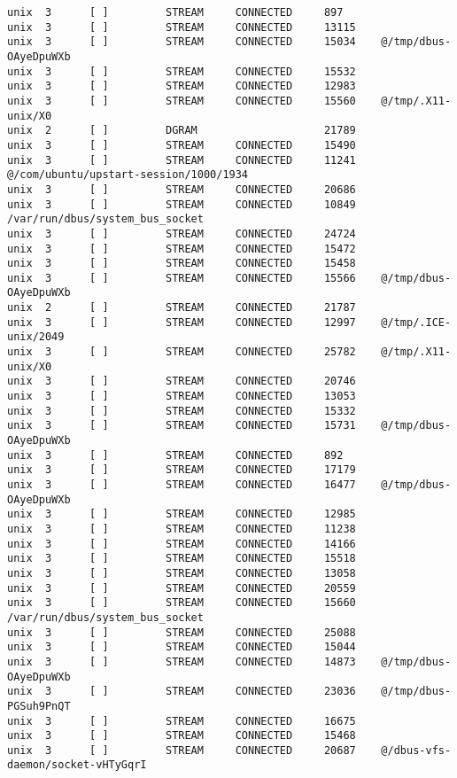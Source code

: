 \begin{lstlisting}
unix  3      [ ]         STREAM     CONNECTED     897      
unix  3      [ ]         STREAM     CONNECTED     13115    
unix  3      [ ]         STREAM     CONNECTED     15034    @/tmp/dbus-OAyeDpuWXb
unix  3      [ ]         STREAM     CONNECTED     15532    
unix  3      [ ]         STREAM     CONNECTED     12983    
unix  3      [ ]         STREAM     CONNECTED     15560    @/tmp/.X11-unix/X0
unix  2      [ ]         DGRAM                    21789    
unix  3      [ ]         STREAM     CONNECTED     15490    
unix  3      [ ]         STREAM     CONNECTED     11241    @/com/ubuntu/upstart-session/1000/1934
unix  3      [ ]         STREAM     CONNECTED     20686    
unix  3      [ ]         STREAM     CONNECTED     10849    /var/run/dbus/system_bus_socket
unix  3      [ ]         STREAM     CONNECTED     24724    
unix  3      [ ]         STREAM     CONNECTED     15472    
unix  3      [ ]         STREAM     CONNECTED     15458    
unix  3      [ ]         STREAM     CONNECTED     15566    @/tmp/dbus-OAyeDpuWXb
unix  2      [ ]         STREAM     CONNECTED     21787    
unix  3      [ ]         STREAM     CONNECTED     12997    @/tmp/.ICE-unix/2049
unix  3      [ ]         STREAM     CONNECTED     25782    @/tmp/.X11-unix/X0
unix  3      [ ]         STREAM     CONNECTED     20746    
unix  3      [ ]         STREAM     CONNECTED     13053    
unix  3      [ ]         STREAM     CONNECTED     15332    
unix  3      [ ]         STREAM     CONNECTED     15731    @/tmp/dbus-OAyeDpuWXb
unix  3      [ ]         STREAM     CONNECTED     892      
unix  3      [ ]         STREAM     CONNECTED     17179    
unix  3      [ ]         STREAM     CONNECTED     16477    @/tmp/dbus-OAyeDpuWXb
unix  3      [ ]         STREAM     CONNECTED     12985    
unix  3      [ ]         STREAM     CONNECTED     11238    
unix  3      [ ]         STREAM     CONNECTED     14166    
unix  3      [ ]         STREAM     CONNECTED     15518    
unix  3      [ ]         STREAM     CONNECTED     13058    
unix  3      [ ]         STREAM     CONNECTED     20559    
unix  3      [ ]         STREAM     CONNECTED     15660    /var/run/dbus/system_bus_socket
unix  3      [ ]         STREAM     CONNECTED     25088    
unix  3      [ ]         STREAM     CONNECTED     15044    
unix  3      [ ]         STREAM     CONNECTED     14873    @/tmp/dbus-OAyeDpuWXb
unix  3      [ ]         STREAM     CONNECTED     23036    @/tmp/dbus-PGSuh9PnQT
unix  3      [ ]         STREAM     CONNECTED     16675    
unix  3      [ ]         STREAM     CONNECTED     15468    
unix  3      [ ]         STREAM     CONNECTED     20687    @/dbus-vfs-daemon/socket-vHTyGqrI

\end{lstlisting}
